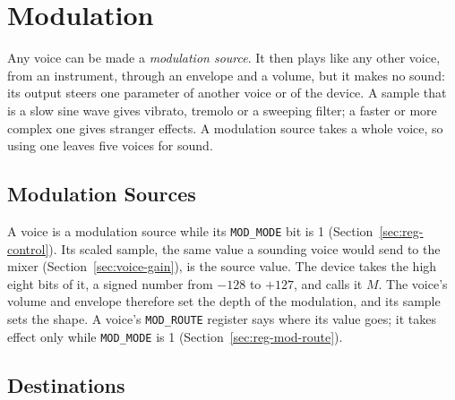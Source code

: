 \chapter{Modulation}
\label{ch:modulation}

Any voice can be made a \emph{modulation source}. It then plays like any other voice, from an instrument, through an
envelope and a volume, but it makes no sound: its output steers one parameter of another voice or of the device. A
sample that is a slow sine wave gives vibrato, tremolo or a sweeping filter; a faster or more complex one gives
stranger effects. A modulation source takes a whole voice, so using one leaves five voices for sound.

\section{Modulation Sources}

A voice is a modulation source while its \texttt{MOD\_MODE} bit is 1 (Section~\ref{sec:reg-control}). Its scaled
sample, the same value a sounding voice would send to the mixer (Section~\ref{sec:voice-gain}), is the source value.
The device takes the high eight bits of it, a signed number from $-128$ to $+127$, and calls it $M$. The voice's volume
and envelope therefore set the depth of the modulation, and its sample sets the shape. A voice's \texttt{MOD\_ROUTE}
register says where its value goes; it takes effect only while \texttt{MOD\_MODE} is 1
(Section~\ref{sec:reg-mod-route}).

\section{Destinations}

